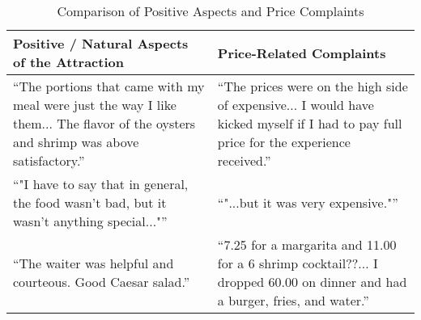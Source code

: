 \begin{table*}[h]
    \centering
    \caption{Comparison of Positive Aspects and Price Complaints}
    \begin{tabular}{p{7cm} | p{7cm}}
        \toprule
        \textbf{Positive / Natural Aspects of the Attraction} & \textbf{Price-Related Complaints} \\
        \midrule
        \textquotedblleft The portions that came with my meal were just the way I like them... The flavor of the oysters and shrimp was above satisfactory.\textquotedblright & \textquotedblleft The prices were on the high side of expensive... I would have kicked myself if I had to pay full price for the experience received.\textquotedblright \\
        \hline
        \textquotedblleft "I have to say that in general, the food wasn't bad, but it wasn't anything special..."\textquotedblright & \textquotedblleft "...but it was very expensive."\textquotedblright \\
        \hline
        \textquotedblleft The waiter was helpful and courteous. Good Caesar salad.\textquotedblright & \textquotedblleft 7.25 for a margarita and 11.00 for a 6 shrimp cocktail??... I dropped 60.00 on dinner and had a burger, fries, and water.\textquotedblright \\
        \hline
        
    \end{tabular}
    \label{tab:yelp_short}
\end{table*}